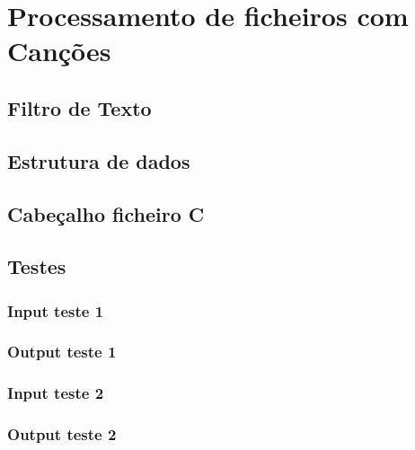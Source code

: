 \section{Processamento de ficheiros com Canções}
\label{seq:anex-music}

\subsection{Filtro de Texto}
\label{seq:anex-music-filtro}


\subsection{Estrutura de dados}
\label{seq:anex-music-est}


\subsection{Cabeçalho ficheiro C}
\label{seq:anex-music-header}


\subsection{Testes}
\label{seq:anex-music-tests}
\subsubsection{Input teste 1}
\label{seq:anex-music-test-in01}


\subsubsection{Output teste 1}
\label{seq:anex-music-test-out01}


\subsubsection{Input teste 2}
\label{seq:anex-music-test-in02}


\subsubsection{Output teste 2}
\label{seq:anex-music-test-out02}


